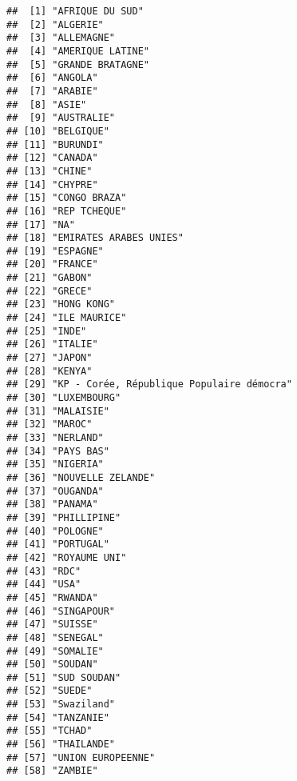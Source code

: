 \documentclass[
]{book}
\begin{document}
\begin{verbatim}
##  [1] "AFRIQUE DU SUD"                          
##  [2] "ALGERIE"                                 
##  [3] "ALLEMAGNE"                               
##  [4] "AMERIQUE LATINE"                         
##  [5] "GRANDE BRATAGNE"                         
##  [6] "ANGOLA"                                  
##  [7] "ARABIE"                                  
##  [8] "ASIE"                                    
##  [9] "AUSTRALIE"                               
## [10] "BELGIQUE"                                
## [11] "BURUNDI"                                 
## [12] "CANADA"                                  
## [13] "CHINE"                                   
## [14] "CHYPRE"                                  
## [15] "CONGO BRAZA"                             
## [16] "REP TCHEQUE"                             
## [17] "NA"                                      
## [18] "EMIRATES ARABES UNIES"                   
## [19] "ESPAGNE"                                 
## [20] "FRANCE"                                  
## [21] "GABON"                                   
## [22] "GRECE"                                   
## [23] "HONG KONG"                               
## [24] "ILE MAURICE"                             
## [25] "INDE"                                    
## [26] "ITALIE"                                  
## [27] "JAPON"                                   
## [28] "KENYA"                                   
## [29] "KP - Corée, République Populaire démocra"
## [30] "LUXEMBOURG"                              
## [31] "MALAISIE"                                
## [32] "MAROC"                                   
## [33] "NERLAND"                                 
## [34] "PAYS BAS"                                
## [35] "NIGERIA"                                 
## [36] "NOUVELLE ZELANDE"                        
## [37] "OUGANDA"                                 
## [38] "PANAMA"                                  
## [39] "PHILLIPINE"                              
## [40] "POLOGNE"                                 
## [41] "PORTUGAL"                                
## [42] "ROYAUME UNI"                             
## [43] "RDC"                                     
## [44] "USA"                                     
## [45] "RWANDA"                                  
## [46] "SINGAPOUR"                               
## [47] "SUISSE"                                  
## [48] "SENEGAL"                                 
## [49] "SOMALIE"                                 
## [50] "SOUDAN"                                  
## [51] "SUD SOUDAN"                              
## [52] "SUEDE"                                   
## [53] "Swaziland"                               
## [54] "TANZANIE"                                
## [55] "TCHAD"                                   
## [56] "THAILANDE"                               
## [57] "UNION EUROPEENNE"                        
## [58] "ZAMBIE"
\end{verbatim}
\end{document}
